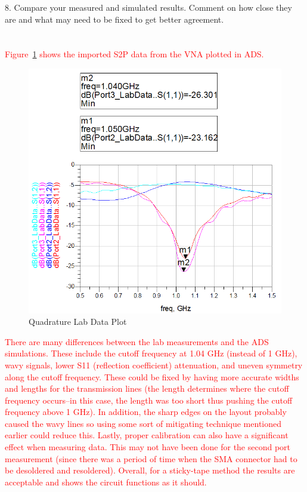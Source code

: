 \documentclass[conference]{IEEEtran}
\begin{document}
8. Compare your measured and simulated results. Comment on how close they are and what may need to be fixed to get better agreement.\\\\\\
\textcolor{red}{Figure~\ref{fig:labdata_plot} shows the imported S2P data from the VNA plotted in ADS.}
\begin{figure}[!htb]
\centering
\includegraphics[scale=0.35]{quadrature-labdata-plot.png}
\caption{Quadrature Lab Data Plot}
\label{fig:labdata_plot}
\end{figure}

\textcolor{red}{There are many differences between the lab measurements and the ADS simulations.  These include the cutoff frequency at 1.04 GHz (instead of 1 GHz), wavy signals, lower S11 (reflection coefficient) attenuation, and uneven symmetry along the cutoff frequency.  These could be fixed by having more accurate widths and lengths for the transmission lines (the length determines where the cutoff frequency occurs--in this case, the length was too short thus pushing the cutoff frequency above 1 GHz).  In addition, the sharp edges on the layout probably caused the wavy lines so using some sort of mitigating technique mentioned earlier could reduce this.  Lastly, proper calibration can also have a significant effect when measuring data.  This may not have been done for the second port measurement (since there was a period of time when the SMA connector had to be desoldered and resoldered).  Overall, for a sticky-tape method the results are acceptable and shows the circuit functions as it should.}\\
\end{document}
